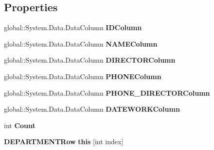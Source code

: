 \subsection*{Properties}
\begin{CompactItemize}
\item 
global::System.Data.DataColumn \textbf{IDColumn}\hspace{0.3cm}{\tt  [get]}\label{class_automatic_medical_system_1_1_data_set1_1_1_d_e_p_a_r_t_m_e_n_t_data_table_8eec570d0e3703a4a345902db65600f0}

\item 
global::System.Data.DataColumn \textbf{NAMEColumn}\hspace{0.3cm}{\tt  [get]}\label{class_automatic_medical_system_1_1_data_set1_1_1_d_e_p_a_r_t_m_e_n_t_data_table_b4513ccf6f2255dbf30243ff969e4411}

\item 
global::System.Data.DataColumn \textbf{DIRECTORColumn}\hspace{0.3cm}{\tt  [get]}\label{class_automatic_medical_system_1_1_data_set1_1_1_d_e_p_a_r_t_m_e_n_t_data_table_6ea1923aea14f077f9d1431c74e3c724}

\item 
global::System.Data.DataColumn \textbf{PHONEColumn}\hspace{0.3cm}{\tt  [get]}\label{class_automatic_medical_system_1_1_data_set1_1_1_d_e_p_a_r_t_m_e_n_t_data_table_67c7ec9d7fe60728b9a8a05ab5a77799}

\item 
global::System.Data.DataColumn \textbf{PHONE\_\-DIRECTORColumn}\hspace{0.3cm}{\tt  [get]}\label{class_automatic_medical_system_1_1_data_set1_1_1_d_e_p_a_r_t_m_e_n_t_data_table_55af444c04bd0b7ad2ebff4abeaf6bd4}

\item 
global::System.Data.DataColumn \textbf{DATEWORKColumn}\hspace{0.3cm}{\tt  [get]}\label{class_automatic_medical_system_1_1_data_set1_1_1_d_e_p_a_r_t_m_e_n_t_data_table_3b62ffb2c2581e0d9840347a39117c62}

\item 
int \textbf{Count}\hspace{0.3cm}{\tt  [get]}\label{class_automatic_medical_system_1_1_data_set1_1_1_d_e_p_a_r_t_m_e_n_t_data_table_1eb9a15c40cdb76a844faff20444fb3b}

\item 
{\bf DEPARTMENTRow} \textbf{this} [int index]\hspace{0.3cm}{\tt  [get]}\label{class_automatic_medical_system_1_1_data_set1_1_1_d_e_p_a_r_t_m_e_n_t_data_table_881fba693a18570b827718a234b57307}

\end{CompactItemize}
